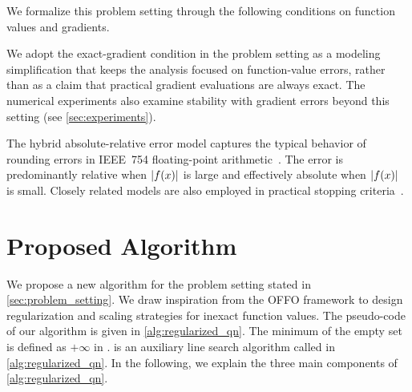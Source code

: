 \documentclass[journal_revised_MPC]{subfiles}
\begin{document}
We formalize this problem setting through the following conditions on function values and gradients.
\begin{problemsetting}
\end{problemsetting}

We adopt the exact-gradient condition in the problem setting as a modeling simplification that keeps the analysis focused on function-value errors, rather than as a claim that practical gradient evaluations are always exact.
The numerical experiments also examine stability with gradient errors beyond this setting (see \cref{sec:experiments}).

The hybrid absolute-relative error model captures the typical behavior of rounding errors in IEEE~754 floating-point arithmetic~\citep{highamAccuracyStabilityNumerical2002,10.5555/3168451.3168462}.
The error is predominantly relative when $\abs{f(x)}$ is large and effectively absolute when $\abs{f(x)}$ is small.
Closely related models are also employed in practical stopping criteria~\citep{2020SciPy-NMeth}.

\section{Proposed Algorithm}\label{sec:algorithm}

We propose a new algorithm for the problem setting stated in \cref{sec:problem_setting}.
We draw inspiration from the OFFO framework to design regularization and scaling strategies for inexact function values.
The pseudo-code of our algorithm is given in \cref{alg:regularized_qn}.
The minimum of the empty set is defined as $+\infty$ in .
 is an auxiliary line search algorithm called in \cref{alg:regularized_qn}.
In the following, we explain the three main components of \cref{alg:regularized_qn}.
\end{document}
